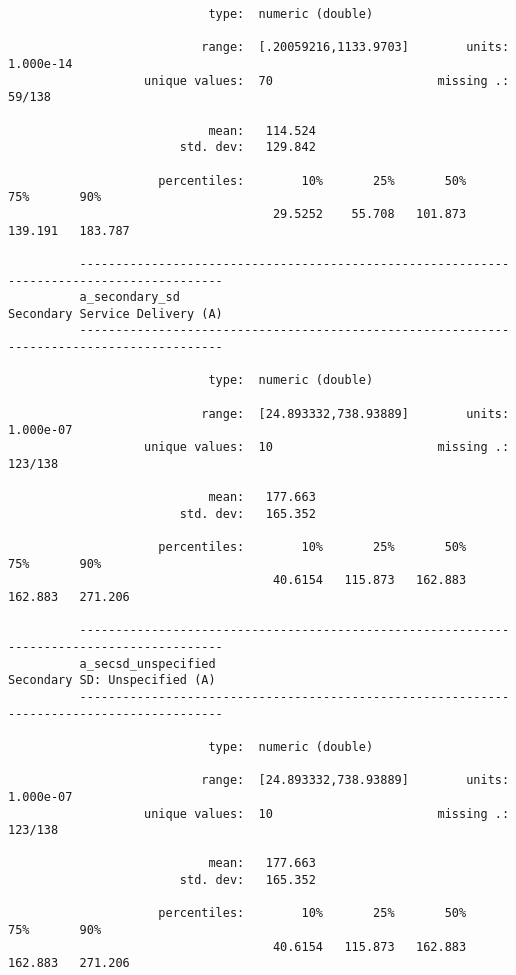 \documentclass{article}
\begin{document}
\begin{verbatim}
                            type:  numeric (double)
          
                           range:  [.20059216,1133.9703]        units:  1.000e-14
                   unique values:  70                       missing .:  59/138
          
                            mean:   114.524
                        std. dev:   129.842
          
                     percentiles:        10%       25%       50%       75%       90%
                                     29.5252    55.708   101.873   139.191   183.787
          
          ------------------------------------------------------------------------------------------
          a_secondary_sd                                              Secondary Service Delivery (A)
          ------------------------------------------------------------------------------------------
          
                            type:  numeric (double)
          
                           range:  [24.893332,738.93889]        units:  1.000e-07
                   unique values:  10                       missing .:  123/138
          
                            mean:   177.663
                        std. dev:   165.352
          
                     percentiles:        10%       25%       50%       75%       90%
                                     40.6154   115.873   162.883   162.883   271.206
          
          ------------------------------------------------------------------------------------------
          a_secsd_unspecified                                          Secondary SD: Unspecified (A)
          ------------------------------------------------------------------------------------------
          
                            type:  numeric (double)
          
                           range:  [24.893332,738.93889]        units:  1.000e-07
                   unique values:  10                       missing .:  123/138
          
                            mean:   177.663
                        std. dev:   165.352
          
                     percentiles:        10%       25%       50%       75%       90%
                                     40.6154   115.873   162.883   162.883   271.206
          

\end{verbatim}
\end{document}
